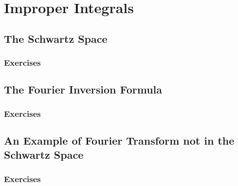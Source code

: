 \setcounter{chapter}{0}
\renewcommand{\thechapter}{14}
\chapter{Improper Integrals}\label{ch:14}
\setcounter{equation}{0}	        %

\section{The Schwartz Space}\label{sec:14.1}
\subsection*{Exercises}\label{sec:14.1_Exercises}
\section{The Fourier Inversion Formula}\label{sec:14.2}	
\subsection*{Exercises}\label{sec:14.2_Exercises}
\section{An Example of Fourier Transform not in the Schwartz Space}\label{sec:14.3}	
\subsection*{Exercises}\label{sec:14.3_Exercises}
